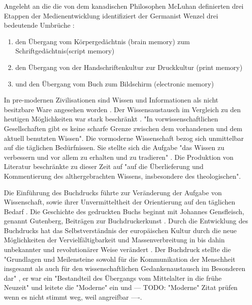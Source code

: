 Angeleht an die die von dem kanadischen Philosophen McLuhan definierten drei Etappen der Medienentwicklung \cite{wunderlich_2008_buchdruck} identifiziert der Germanist Wenzel drei bedeutende Umbrüche \cite{wenzel_mediengeschichte_2007}:
\begin{enumerate}
\item den Übergang vom Körpergedächtnis (brain memory) zum Schriftgedächtnis(script memory)
\item den Übergang von der Handschriftenkultur zur Druckkultur (print memory)
\item und den Übergang vom Buch zum Bildschirm (electronic memory)
\end{enumerate}

In pre-modernen Zivilisationen sind Wissen und Informationen als nicht besitzbare Ware angesehen worden\cite{cite:18} \cite{steiner_1998_autorenhonorar}. Der Wissensaustausch im Vergleich zu den heutigen Möglichkeiten war stark beschränkt \cite{cite:17c}. "In vorwissenschaftlichen Gesellschaften gibt es keine scharfe Grenze zwischen dem vorhandenen und dem aktuell benutzten Wissen"\cite{Luhmann1998}. Die vormoderne Wissenschaft bezog sich unmittelbar auf die täglichen Bedürfnissen. Sie stellte sich die Aufgabe "das Wissen zu verbessern und vor allem zu erhalten und zu tradieren" \cite{Luhmann1998}. Die Produktion von Literatur beschränkte zu dieser Zeit auf "auf die Überlieferung und Kommentierung des althergebrachten Wissens, insbesondere des theologischen"\cite{steiner_1998_autorenhonorar}.

Die Einführung des Buchdrucks führte zur Veränderung der Aufgabe von Wissenschaft, sowie ihrer Unvermitteltheit der Orientierung auf den täglichen Bedarf \cite{Luhmann1998}. Die Geschichte des gedruckten Buchs beginnt mit Johannes Gensfleisch, genannt Gutenberg, Beiträgen zur Buchdruckerkunst \cite{wittmann_1999_geschichte}. Durch die Entwicklung des Buchdrucks hat das Selbstverständnis der europäischen Kultur durch die neue Möglichkeiten der Vervielfältigbarkeit und Massenverbreitung in bis dahin unbekannter \cite{giesecke_1991_buchdruck} und revolutionärer Weise verändert \cite{wunderlich_2008_buchdruck}. Der Buchdruck stellte die "Grundlagen und Meilensteine sowohl für die Kommunikation der Menschheit insgesamt als auch für den wissenschaftlichen Gedankenaustausch im Besonderen dar" \cite{schirmbacher_2009_wisspub}, er war ein "Bestandteil des Übergangs vom Mittelalter in die frühe Neuzeit" \cite{lange2008medienwettbewerb} und leitete die "Moderne" ein \cite{luhmann_1997_gesellschaft} und  --- TODO: "Moderne" Zitat prüfen wenn es nicht stimmt weg, weil angreifbar ----.

